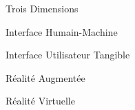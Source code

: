 \item [3D] Trois Dimensions
\item [IHM] Interface Humain-Machine
\item [IUT] Interface Utilisateur Tangible
\item [RA] Réalité Augmentée
\item [RV] Réalité Virtuelle